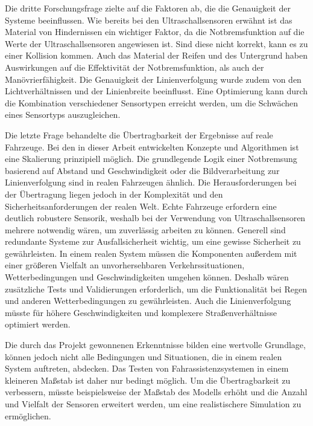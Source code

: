 Die dritte Forschungsfrage zielte auf die Faktoren ab, die die Genauigkeit der Systeme beeinflussen. Wie bereits bei den Ultraschallsensoren erwähnt ist das Material von Hindernissen ein wichtiger Faktor, da die Notbremsfunktion auf die Werte der Ultraschallsensoren angewiesen ist. Sind diese nicht korrekt, kann es zu einer Kollision kommen. Auch das Material der Reifen und des Untergrund haben Auswirkungen auf die Effektivität der Notbremsfunktion, als auch der Manövrierfähigkeit. Die Genauigkeit der Linienverfolgung wurde zudem von den Lichtverhältnissen und der Linienbreite beeinflusst. Eine Optimierung kann durch die Kombination verschiedener Sensortypen erreicht werden, um die Schwächen eines Sensortyps auszugleichen. 

Die letzte Frage behandelte die Übertragbarkeit der Ergebnisse auf reale Fahrzeuge. Bei den in dieser Arbeit entwickelten Konzepte und Algorithmen ist eine Skalierung prinzipiell möglich. Die grundlegende Logik einer Notbremsung basierend auf Abstand und Geschwindigkeit oder die Bildverarbeitung zur Linienverfolgung sind in realen Fahrzeugen ähnlich. Die Herausforderungen bei der Übertragung liegen jedoch in der Komplexität und den Sicherheitsanforderungen der realen Welt. Echte Fahrzeuge erfordern eine deutlich robustere Sensorik, weshalb bei der Verwendung von Ultraschallsensoren mehrere notwendig wären, um zuverlässig arbeiten zu können. Generell sind redundante Systeme zur Ausfallsicherheit wichtig, um eine gewisse Sicherheit zu gewährleisten. In einem realen System müssen die Komponenten außerdem mit einer größeren Vielfalt an unvorhersehbaren Verkehrssituationen, Wetterbedingungen und Geschwindigkeiten umgehen können. Deshalb wären zusätzliche Tests und Validierungen erforderlich, um die Funktionalität bei Regen und anderen Wetterbedingungen zu gewährleisten. Auch die Linienverfolgung müsste für höhere Geschwindigkeiten und komplexere Straßenverhältnisse optimiert werden.

Die durch das Projekt gewonnenen Erkenntnisse bilden eine wertvolle Grundlage, können jedoch nicht alle Bedingungen und Situationen, die in einem realen System auftreten, abdecken. Das Testen von Fahrassistenzsystemen in einem kleineren Maßstab ist daher nur bedingt möglich. Um die Übertragbarkeit zu verbessern, müsste beispielsweise der Maßstab des Modells erhöht und die Anzahl und Vielfalt der Sensoren erweitert werden, um eine realistischere Simulation zu ermöglichen.


